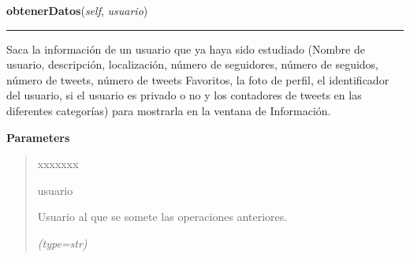     \label{funcionesTwitter:FuncionesTwitter:obtenerDatos}

    \vspace{0.5ex}

\hspace{.8\funcindent}\begin{boxedminipage}{\funcwidth}

    \raggedright \textbf{obtenerDatos}(\textit{self}, \textit{usuario})

    \vspace{-1.5ex}

    \rule{\textwidth}{0.5\fboxrule}
\setlength{\parskip}{2ex}
    Saca la información de un usuario que ya haya sido estudiado (Nombre de
    usuario, descripción, localización, número de seguidores, número de 
    seguidos, número de tweets, número de tweets Favoritos, la foto de 
    perfil, el identificador del usuario, si el usuario es privado o no y 
    los contadores de tweets en las diferentes categorías) para mostrarla 
    en la ventana de Información.

\setlength{\parskip}{1ex}
      \textbf{Parameters}
      \vspace{-1ex}

      \begin{quote}
        \begin{Ventry}{xxxxxxx}

          \item[usuario]

          Usuario al que se somete las operaciones anteriores.

            {\it (type=str)}

        \end{Ventry}

      \end{quote}

    \end{boxedminipage}

    \label{funcionesTwitter:FuncionesTwitter:contadorTweetsPorCategorias}

    \vspace{0.5ex}

